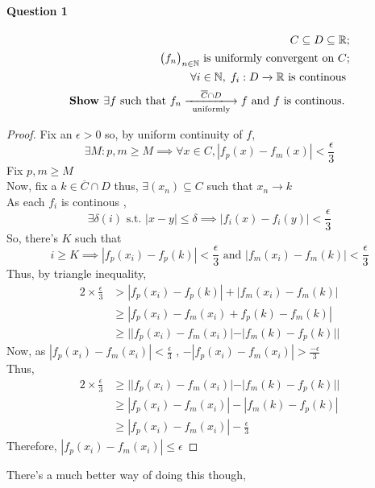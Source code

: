 \documentclass[20pt,a4paper]{extarticle} %
\begin{document}
\paragraph{Question 1}
\begin{eqnarray*}
	C \subseteq D \subseteq \mathbb{R};\\
	\big(f _n\big)_{n \in \mathbb{N}} \text{ is uniformly convergent on } C ;\\
	\forall i \in \mathbb{N} , \; f_i : D \xrightarrow{} \mathbb{R} \text{ is continous }\\
	\textbf{Show } \exists f \text{ such that } f_n \xlongrightarrow [ \text{ uniformly }]{ \overline{C} \cap D } f
	\text{ and } f \text{ is continous. }
\end{eqnarray*}
\begin{proof}
	Fix an $\epsilon > 0$ so, by uniform continuity of $f$,
	\[ \exists M: p,m \geq M \implies \forall x \in C, |f_p(x) - f_m(x)| < \frac{\epsilon}{3} \]
	Fix $p,m \geq M$ \\
	Now, fix a  $k \in \overline{C} \cap D$ thus, $\exists (x_n) \subseteq C$ such that $x_n \to k$ \\
	As each $f_i$ is continous ,
	\[ \exists \delta(i) \text{ s.t. } |x-y|\leq \delta \implies |f_i(x)-f_i(y)|<\frac{\epsilon}{3} \]
	So, there's $K$ such that
	\[ i\geq K \implies |f_p(x_i)-f_p(k)|< \frac{\epsilon}{3} \text{ and } |f_m(x_i)-f_m(k)|< \frac{\epsilon}{3} \]
	Thus, by triangle inequality,
	\begin{align*}
		2 \times \frac{\epsilon}{3} & > |f_p(x_i)-f_p(k)| + |f_m(x_i)-f_m(k)| \\
					    & \geq |f_p(x_i)-f_m(x_i)+f_p(k)-f_m(k)| \\
					    & \geq ||f_p(x_i)-f_m(x_i)|-|f_m(k)-f_p(k)||
	\end{align*}
	Now, as $|f_p(x_i)-f_m(x_i)|< \frac{\epsilon}{3}$ , $-|f_p(x_i)-f_m(x_i)|> \frac{-\epsilon}{3}$ \\
	Thus,
	\begin{align*}
		2 \times \frac{\epsilon}{3} & \geq ||f_p(x_i)-f_m(x_i)|-|f_m(k)-f_p(k)|| \\
					    & \geq |f_p(x_i)-f_m(x_i)|-|f_m(k)-f_p(k)|\\
					    & \geq |f_p(x_i)-f_m(x_i)|- \frac{\epsilon}{3}
	\end{align*}
	Therefore, $|f_p(x_i)-f_m(x_i)| \leq \epsilon$
\end{proof}
There's a much better way of doing this though,
\end{document}

